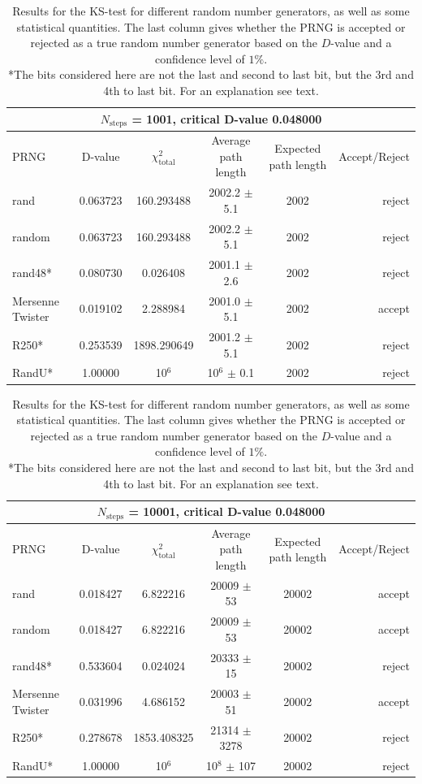 \documentclass[10pt,a4paper]{article}
\begin{document}
\begin{center}
\begin{table}[H]
\begin{tabular}{l *{4}{c} r}
\hline
\multicolumn{6}{c}{$N_{\text{steps}}$ = 1001, critical D-value 0.048000}\\
\hline
PRNG & D-value & $\chi^2_{\text{total}}$ & Average path length & Expected path length & Accept/Reject\\
\hline
rand &  0.063723 & 160.293488 & 2002.2 $\pm$ 5.1 & 2002 & reject\\
random &  0.063723 & 160.293488 & 2002.2 $\pm$ 5.1 & 2002 & reject\\
rand48* & 0.080730 & 0.026408 & 2001.1 $\pm$ 2.6 & 2002 & reject\\
Mersenne Twister & 0.019102 & 2.288984 & 2001.0 $\pm$ 5.1 &  2002 & accept\\
R250* & 0.253539 & 1898.290649 & 2001.2 $\pm$ 5.1 & 2002 & reject\\
RandU* & 1.00000 & 10$^6$ & 10$^6$ $\pm$ 0.1 & 2002 & reject\\
\hline
\end{tabular}
\newline
\begin{tabular}{l *{4}{c} r}
\hline
\multicolumn{6}{c}{$N_{\text{steps}}$ = 10001, critical D-value 0.048000}\\
\hline
PRNG & D-value & $\chi^2_{\text{total}}$ & Average path length & Expected path length & Accept/Reject\\
\hline
rand &  0.018427 & 6.822216 & 20009 $\pm$ 53 & 20002 & accept\\
random & 0.018427 & 6.822216 & 20009 $\pm$ 53 & 20002 & accept\\
rand48* & 0.533604 & 0.024024 & 20333 $\pm$ 15 & 20002 & reject\\
Mersenne Twister & 0.031996 & 4.686152 & 20003 $\pm$ 51 & 20002 & accept\\
R250* & 0.278678 & 1853.408325 & 21314 $\pm$ 3278 & 20002 & reject\\
RandU* & 1.00000 & 10$^6$ & 10$^8$ $\pm$ 107 & 20002 & reject\\
\hline
\end{tabular}
\caption[width=5.0cm]{Results for the KS-test for different random number generators, as well as some statistical quantities. The last column gives whether the PRNG is accepted or rejected as a true random number generator based on the $D$-value and a confidence level of $1\%$.\\
*The bits considered here are not the last and second to last bit, but the 3rd and 4th to last bit. For an explanation see text.}
\end{table}

\end{center}
\end{document}
